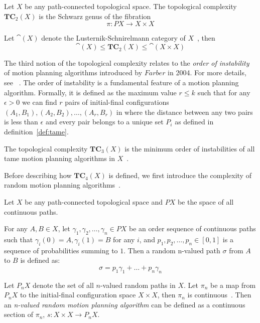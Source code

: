 \begin{definition}
  Let \(X\) be any path-connected topological space. The topological complexity \(\mathbf{TC}_2(X)\) is the Schwarz genus of the fibration~\cite{farber2006topology}
  \[\pi:PX\to X\times X\]
\end{definition}

Let \(\cat(X)\) denote the Lusternik-Schnirelmann category of \(X\)~\cite{cornea2003lusternik}, then
\[\cat(X)\le \mathbf{TC}_2(X)\le \cat(X\times X)\]

The third notion of the topological complexity relates to the \emph{order of instability} of motion planning algorithms introduced by \(Farber\) in 2004. For more details, see ~\cite{farber2004instabilities}.
The order of instability is a fundamental feature of a motion planning algorithm.
Formally, it is defined as the maximum value \(r\le k\) such that for any \(\epsilon>0\) we can find \(r\) pairs of initial-final configurations \((A_1,B_1),(A_2,B_2),\dots,(A_r,B_r)\) in where the distance between any two pairs is less than \(\epsilon\) and every pair belongs to a unique set \(P_i\) as defined in definition~\ref{def:tame}.

\begin{definition}
  The topological complexity \(\mathbf{TC}_3(X)\) is the minimum order of instabilities of all tame motion planning algorithms in \(X\)~\cite{farber2006topology}.
\end{definition}

Before describing how \(\mathbf{TC}_4(X)\) is defined, we first introduce the complexity of random motion planning algorithms~\cite{farber2004collision}.

Let \(X\) be any path-connected topological space and \(PX\) be the space of all continuous paths.
\begin{definition}
  For any \(A,B\in X\), let \(\gamma_1,\gamma_2,\dots,\gamma_n\in PX\) be an order sequence of continuous paths such that \(\gamma_i(0)=A,\gamma_i(1)=B\) for any \(i\), and \(p_1,p_2,\dots,p_n\in [0,1]\) is a sequence of probabilities summing to \(1\). Then a random n-valued path \(\sigma\) from \(A\) to \(B\) is defined as:
  \[\sigma=p_1\gamma_1+\dots+p_n\gamma_n\]
\end{definition}

Let \(P_nX\) denote the set of all \(n\)-valued random paths in \(X\).
Let \(\pi_n\) be a map from \(P_nX\) to the initial-final configuration space \(X\times X\), then \(\pi_n\) is continuous~\cite{farber2004collision}.
Then an \emph{n-valued random motion planning algorithm} can be defined as a continuous section of \(\pi_n\), \(s:X\times X\to P_n X\).

